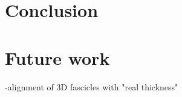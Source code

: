 \documentclass[preprint,journal]{vgtc}       %
\begin{document}
\section{Conclusion}


\section{Future work}
-alignment of 3D fascicles with "real thickness"



\end{document}
